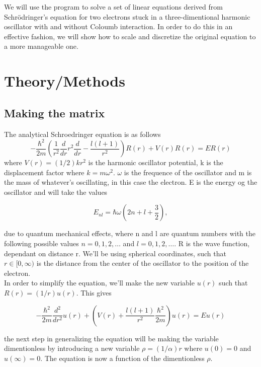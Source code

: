 \documentclass[10pt]{article}
\begin{document}
\begin{multicols}{2}
We will use the program to solve a set of linear equations derived from
Schrödringer's equation for two electrons stuck in a three-dimentional
harmonic oscillator with and without Coloumb interaction. In order to do
this in an effective fashion, we will show how to scale and discretize the
original equation to a more manageable one.



\section{Theory/Methods}
\subsection{Making the matrix}
The analytical Schroedringer equation is as follows
\begin{equation*}
  -\frac{\hbar^2}{2 m} \left ( \frac{1}{r^2} \frac{d}{dr} r^2
  \frac{d}{dr} - \frac{l (l + 1)}{r^2} \right )R(r) 
     + V(r) R(r) = E R(r)
\end{equation*}
where  $V(r) = (1/2)kr^2$ is the harmonic oscillator potential, k is the
displacement factor where $k=m\omega^2$.  $\omega$ is the frequence of the
oscillator and m is the mass of whatever's oscillating, in this case the
electron. E is the energy og the oscillator and will take the values

\begin{equation*}
E_{nl}=  \hbar \omega \left(2n+l+\frac{3}{2}\right),
\end{equation*}

due to quantum mechanical effects, where n and l are quantum numbers with
the following possible values $n=0,1,2,\dots$ and $l=0,1,2,\dots$. R is the
wave function, dependant on distance r. We'll be using spherical
coordinates, such that $r\in [0,\infty)$ is the distance from the center of
the oscillator to the position of the electron.\\

In order to simplify the equation, we'll make the new variable $u(r)$ such
that $R(r) = (1/r) u(r)$. This gives

\begin{equation*}
  -\frac{\hbar^2}{2 m} \frac{d^2}{dr^2} u(r) + \left ( V(r) + \frac{l (l + 1)}{r^2}\frac{\hbar^2}{2 m}\right ) u(r)  = E u(r)
\end{equation*}

the next step in generalizing the equation will be making the variable
dimentionless by introducing a new variable $\rho = (1/\alpha) r$ where
$u(0)=0$ and $u(\infty)=0$. The equation is now a function of the
dimentionless $\rho$.


\end{multicols}
\end{document}
